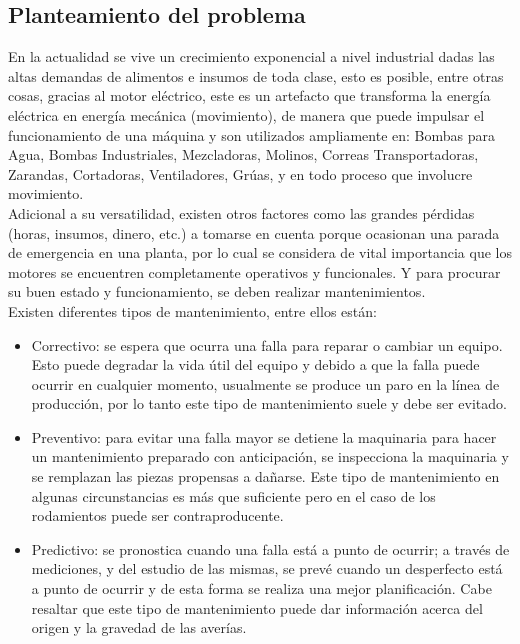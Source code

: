 \setcounter{page}{1}

\begin{center}
	\section{Planteamiento del problema}
\end{center}



	En la actualidad se vive un crecimiento exponencial a nivel industrial dadas las altas demandas de alimentos e insumos de toda clase, esto es posible, entre otras cosas, gracias al motor eléctrico, este es un artefacto que transforma la energía eléctrica en energía mecánica (movimiento), de manera que puede impulsar el funcionamiento de una máquina y son utilizados ampliamente en: Bombas para Agua, Bombas Industriales, Mezcladoras, Molinos, Correas Transportadoras, Zarandas, Cortadoras, Ventiladores, Grúas, y en todo proceso que involucre movimiento.\\


	Adicional a su versatilidad, existen otros factores como las grandes pérdidas (horas, insumos, dinero, etc.) a tomarse en cuenta porque ocasionan una parada de emergencia en una planta, por lo cual se considera de vital importancia que los motores se encuentren completamente operativos y funcionales. Y para procurar su buen estado y funcionamiento, se deben realizar mantenimientos.\\



	Existen diferentes tipos de mantenimiento, entre ellos están:
	\begin{itemize}
		\item Correctivo: se espera que ocurra una falla para reparar o cambiar un equipo. Esto puede degradar la vida útil del equipo y debido a que la falla puede ocurrir en cualquier momento, usualmente se produce un paro en la línea de producción, por lo tanto este tipo de mantenimiento suele y debe ser evitado.

		\item Preventivo: para evitar una falla mayor se detiene la maquinaria para hacer un mantenimiento preparado con anticipación, se inspecciona la maquinaria y se remplazan las piezas propensas a dañarse. Este tipo de mantenimiento en algunas circunstancias es más que suficiente pero en el caso de los rodamientos puede ser contraproducente.

		\item Predictivo: se pronostica cuando una falla está a punto de ocurrir; a través de mediciones, y del estudio de las mismas, se prevé cuando un desperfecto está a punto de ocurrir y de esta forma se realiza una mejor planificación. Cabe resaltar que este tipo de mantenimiento puede dar información acerca del origen y la gravedad de las averías.
	\end{itemize}


